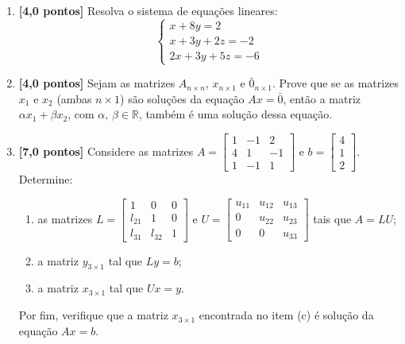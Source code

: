 \documentclass[12pt,a4paper]{article}
\begin{document}
\begin{enumerate}
  \item \textbf{[4,0 pontos]} Resolva o sistema de equações lineares:
    $$\begin{cases}
      x +  8 y  =  2\\
      x  +  3y  +  2z  =  -2\\
      2x  +  3y  +  5z  =  -6
    \end{cases}$$
    
  \item \textbf{[4,0 pontos]} Sejam as matrizes $A_{n\times n}$, $x_{n\times 1}$ e $\bar{0}_{n\times 1}$. Prove 
    que se as matrizes $x_1$ e $x_2$ (ambas $n\times 1$) são soluções da equação 
    $Ax = \bar{0}$, então a matriz $\alpha x_1 + \beta x_2$, com $\alpha,\,\beta\in\mathbb{R}$, 
    também é uma solução dessa equação.
    
  \item \textbf{[7,0 pontos]} Considere as matrizes 
    $A = \begin{bmatrix} 1 & -1 & 2 \\ 4 & 1 & -1 \\ 1 & -1 & 1\end{bmatrix}$ e 
    $b = \begin{bmatrix} 4 \\ 1 \\ 2\end{bmatrix}$. Determine:
    
    \begin{enumerate}
      \item as matrizes $L = \begin{bmatrix} 1 & 0 & 0 \\ l_{21} & 1 & 0 \\ l_{31} & l_{32} & 1\end{bmatrix}$ 
        e $U = \begin{bmatrix} u_{11} & u_{12} & u_{13} \\ 0 & u_{22} & u_{23} \\ 0 & 0 & u_{33}\end{bmatrix}$ 
        tais que $A = LU$;
      \item a matriz $y_{3\times 1}$ tal que $Ly = b$;
      \item a matriz $x_{3\times 1}$ tal que $Ux = y$.
    \end{enumerate}
    
    Por fim, verifique que a matriz $x_{3\times 1}$ encontrada no item (c) 
    é solução da equação $Ax = b$.
   
  \end{enumerate}
\end{document}
